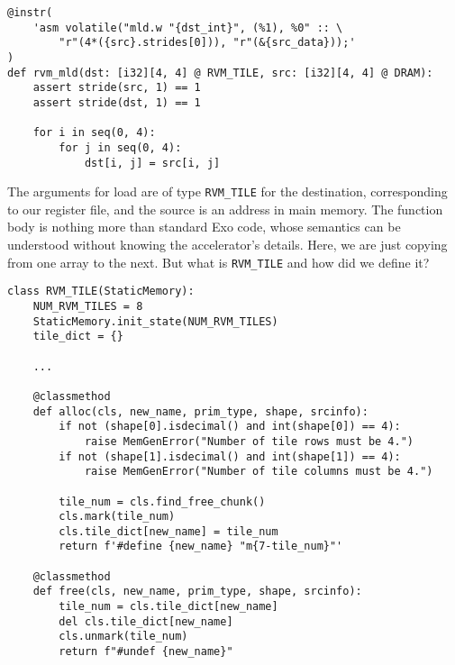 \documentclass[acmsmall, nonacm=true]{acmart}
\begin{document}
\begin{verbatim}
@instr(
    'asm volatile("mld.w "{dst_int}", (%1), %0" :: \
        "r"(4*({src}.strides[0])), "r"(&{src_data}));'
)
def rvm_mld(dst: [i32][4, 4] @ RVM_TILE, src: [i32][4, 4] @ DRAM):
    assert stride(src, 1) == 1
    assert stride(dst, 1) == 1

    for i in seq(0, 4):
        for j in seq(0, 4):
            dst[i, j] = src[i, j]
\end{verbatim}

The arguments for load are of type \verb|RVM_TILE| for the destination, corresponding to our register file, and the source is an address in main memory. The function body is nothing more than standard Exo code, whose semantics can be understood without knowing the accelerator's details. Here, we are just copying from one array to the next. But what is \verb|RVM_TILE| and how did we define it? 

\begin{verbatim}
class RVM_TILE(StaticMemory):
    NUM_RVM_TILES = 8
    StaticMemory.init_state(NUM_RVM_TILES)
    tile_dict = {}

    ...

    @classmethod
    def alloc(cls, new_name, prim_type, shape, srcinfo):
        if not (shape[0].isdecimal() and int(shape[0]) == 4):
            raise MemGenError("Number of tile rows must be 4.")
        if not (shape[1].isdecimal() and int(shape[1]) == 4):
            raise MemGenError("Number of tile columns must be 4.")

        tile_num = cls.find_free_chunk()
        cls.mark(tile_num)
        cls.tile_dict[new_name] = tile_num
        return f'#define {new_name} "m{7-tile_num}"'

    @classmethod
    def free(cls, new_name, prim_type, shape, srcinfo):
        tile_num = cls.tile_dict[new_name]
        del cls.tile_dict[new_name]
        cls.unmark(tile_num)
        return f"#undef {new_name}"

\end{verbatim}
\end{document}
